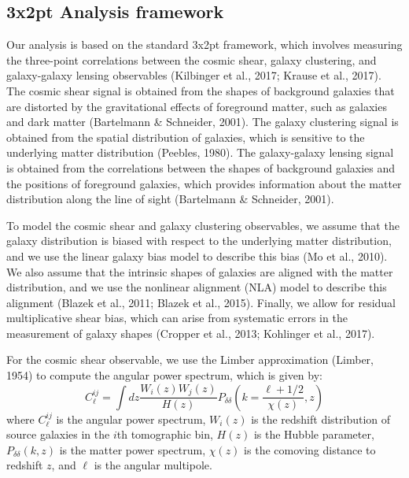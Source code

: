 \documentclass[twocolumn]{aastex631}
\begin{document}
\subsection{3x2pt Analysis framework}

Our analysis is based on the standard 3x2pt framework, which involves measuring the three-point correlations between the cosmic shear, galaxy clustering, and galaxy-galaxy lensing observables (Kilbinger et al., 2017; Krause et al., 2017). The cosmic shear signal is obtained from the shapes of background galaxies that are distorted by the gravitational effects of foreground matter, such as galaxies and dark matter (Bartelmann \& Schneider, 2001). The galaxy clustering signal is obtained from the spatial distribution of galaxies, which is sensitive to the underlying matter distribution (Peebles, 1980). The galaxy-galaxy lensing signal is obtained from the correlations between the shapes of background galaxies and the positions of foreground galaxies, which provides information about the matter distribution along the line of sight (Bartelmann \& Schneider, 2001).

To model the cosmic shear and galaxy clustering observables, we assume that the galaxy distribution is biased with respect to the underlying matter distribution, and we use the linear galaxy bias model to describe this bias (Mo et al., 2010). We also assume that the intrinsic shapes of galaxies are aligned with the matter distribution, and we use the nonlinear alignment (NLA) model to describe this alignment (Blazek et al., 2011; Blazek et al., 2015). Finally, we allow for residual multiplicative shear bias, which can arise from systematic errors in the measurement of galaxy shapes (Cropper et al., 2013; Kohlinger et al., 2017).

For the cosmic shear observable, we use the Limber approximation (Limber, 1954) to compute the angular power spectrum, which is given by:
$$C_{\ell}^{ij} = \int dz \frac{W_i(z)W_j(z)}{H(z)} P_{\delta\delta}\left(k=\frac{\ell+1/2}{\chi(z)},z\right)$$
where $C_{\ell}^{ij}$ is the angular power spectrum, $W_i(z)$ is the redshift distribution of source galaxies in the $i$th tomographic bin, $H(z)$ is the Hubble parameter, $P_{\delta\delta}(k,z)$ is the matter power spectrum, $\chi(z)$ is the comoving distance to redshift $z$, and $\ell$ is the angular multipole.



\end{document}
